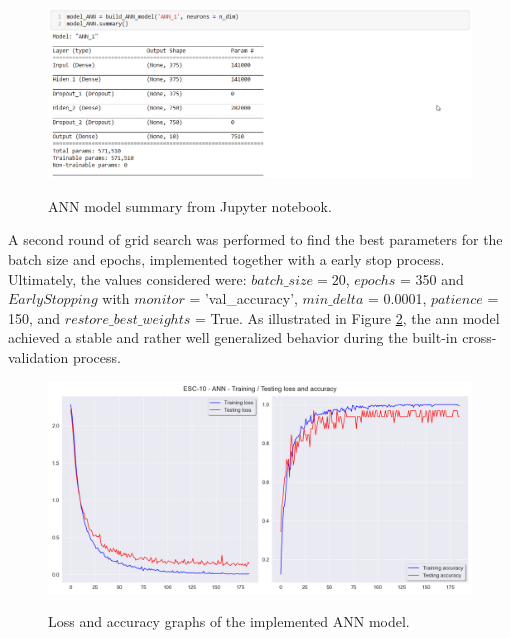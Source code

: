 \begin{figure}[htbp]
    \raggedright
        \caption{ANN model summary from Jupyter notebook.}
        \includegraphics[width=1\textwidth]{resources/images/050-methods/Methods_training_ANN_architecture_jupyter_notebook.png}
        \label{fig:methods_training_ANN_architecture_jupyter_notebook}
\end{figure} 


A second round of grid search was performed to find the best parameters for the batch size and epochs, implemented together with a early stop process. Ultimately, the values considered were: $batch\_size = 20$, $epochs$ = 350 and $EarlyStopping$ with $monitor$ = 'val\_accuracy', $min\_delta$ = 0.0001, $patience$ = 150, and $restore\_best\_weights$ = True. As illustrated in Figure \ref{fig:methods_training_ANN_loss_and_accuracy_graphs}, the \gls{ann} model achieved a stable and rather well generalized behavior during the built-in cross-validation process.


\begin{figure}[htbp]
    \raggedright
        \caption{Loss and accuracy graphs of the implemented ANN model.}
        \includegraphics[width=1\textwidth]{resources/images/050-methods/Methods_training_ANN_loss_accuracy.png}
        \label{fig:methods_training_ANN_loss_and_accuracy_graphs}
\end{figure} 

